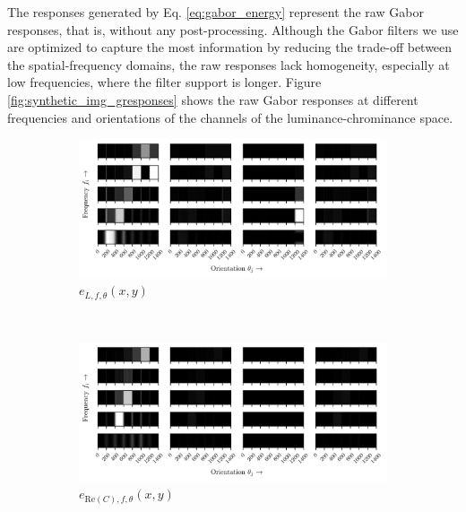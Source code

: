 \documentclass[journal]{IEEEtran}
\newcommand{\RE}{\mathrm{Re}}
\begin{document}
The responses generated by Eq. \eqref{eq:gabor_energy} represent the raw Gabor responses, that is, without any post-processing. Although the Gabor filters we use are optimized to capture the most information by reducing the trade-off between the spatial-frequency domains, the raw responses lack homogeneity, especially at low frequencies, where the filter support is longer. Figure \ref{fig:synthetic_img_gresponses} shows the raw Gabor responses at different frequencies and orientations of the channels of the luminance-chrominance space. 

\begin{figure}[!ht]
    \centering
    \begin{subfigure}[b]{0.45\textwidth}   
        \includegraphics[width=\textwidth]{gabor_resp_lum_synthetic}
        \caption{$e_{L, f, \theta}(x,y)$} 
        \label{fig:lum_raw_gabor_energies}
    \end{subfigure} \\ [2ex]   
    \begin{subfigure}[b]{0.45\textwidth}   
    	\includegraphics[width=\textwidth]{gabor_resp_cr_synthetic}
    	\caption{$e_{\RE(C), f, \theta}(x,y)$}
        \label{fig:cr_raw_gabor_energies}
    \end{subfigure} \\ [2ex]    	
    \begin{subfigure}[b]{0.45\textwidth}  

\end{subfigure}
\end{figure}
\end{document}
